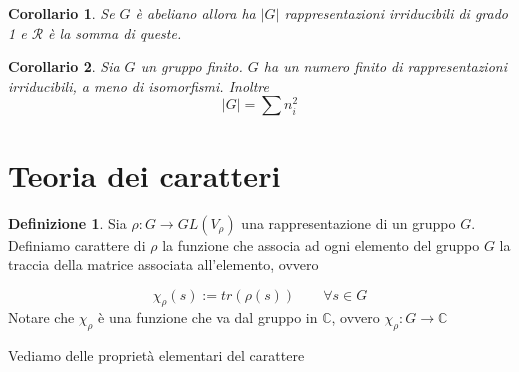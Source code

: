 \documentclass[11pt]{article}
\theoremstyle{plain}
\newtheorem*{cor}{Corollario}
\theoremstyle{definition}
\newtheorem{defn}{Definizione}[section]
\theoremstyle{remark}
\newcommand{\C}{\mathbb{C}}
\newcommand{\dsum}{\displaystyle\sum}
\begin{document}
\begin{cor}
Se $G$ è abeliano allora ha $|G|$ rappresentazioni irriducibili di grado 1 e $\mathcal{R}$ è la somma di queste.
\end{cor}



\begin{cor}
Sia $G$ un gruppo finito. $G$ ha un numero finito di rappresentazioni irriducibili, a meno di isomorfismi. Inoltre
\[|G| = \dsum n_i^2\]
\end{cor}



















\newpage
\section{Teoria dei caratteri}


\begin{defn}
Sia $\rho: G \to GL(V_\rho)$ una rappresentazione di un gruppo $G$. Definiamo carattere di $\rho$ la funzione che associa ad ogni elemento del gruppo $G$ la traccia della matrice associata all'elemento, ovvero

\[\chi_\rho(s) := tr (\rho(s)) \qquad \forall s \in G \]
Notare che $\chi_{\rho}$ è una funzione che va dal gruppo in $\C$, ovvero $\chi_{\rho}: G \to \C$

\end{defn}

Vediamo delle proprietà elementari del carattere
\end{document}
